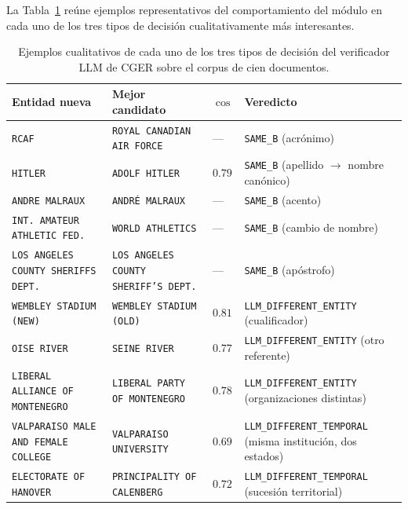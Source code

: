 La Tabla~\ref{tab:eval-ragtest-cger-samples} reúne ejemplos representativos del comportamiento del módulo en cada uno de los tres tipos de decisión cualitativamente más interesantes.

\begin{table}[h]
\centering
\small
\begin{tabular}{p{4.2cm}p{4.2cm}p{1.0cm}p{4.0cm}}
\hline
\textbf{Entidad nueva} & \textbf{Mejor candidato} & \textbf{$\cos$} & \textbf{Veredicto} \\ \hline
\texttt{RCAF} & \texttt{ROYAL CANADIAN AIR FORCE} & --- & \texttt{SAME\_B} (acrónimo) \\
\texttt{HITLER} & \texttt{ADOLF HITLER} & $0.79$ & \texttt{SAME\_B} (apellido $\to$ nombre canónico) \\
\texttt{ANDRE MALRAUX} & \texttt{ANDRÉ MALRAUX} & --- & \texttt{SAME\_B} (acento) \\
\texttt{INT.\ AMATEUR ATHLETIC FED.} & \texttt{WORLD ATHLETICS} & --- & \texttt{SAME\_B} (cambio de nombre) \\
\texttt{LOS ANGELES COUNTY SHERIFFS DEPT.} & \texttt{LOS ANGELES COUNTY SHERIFF'S DEPT.} & --- & \texttt{SAME\_B} (apóstrofo) \\
\hline
\texttt{WEMBLEY STADIUM (NEW)} & \texttt{WEMBLEY STADIUM (OLD)} & $0.81$ & \texttt{LLM\_DIFFERENT\_ENTITY} (cualificador) \\
\texttt{OISE RIVER} & \texttt{SEINE RIVER} & $0.77$ & \texttt{LLM\_DIFFERENT\_ENTITY} (otro referente) \\
\texttt{LIBERAL ALLIANCE OF MONTENEGRO} & \texttt{LIBERAL PARTY OF MONTENEGRO} & $0.78$ & \texttt{LLM\_DIFFERENT\_ENTITY} (organizaciones distintas) \\
\hline
\texttt{VALPARAISO MALE AND FEMALE COLLEGE} & \texttt{VALPARAISO UNIVERSITY} & $0.69$ & \texttt{LLM\_DIFFERENT\_TEMPORAL} (misma institución, dos estados) \\
\texttt{ELECTORATE OF HANOVER} & \texttt{PRINCIPALITY OF CALENBERG} & $0.72$ & \texttt{LLM\_DIFFERENT\_TEMPORAL} (sucesión territorial) \\ \hline
\end{tabular}
\caption{Ejemplos cualitativos de cada uno de los tres tipos de decisión del verificador LLM de CGER sobre el corpus de cien documentos.}
\label{tab:eval-ragtest-cger-samples}
\end{table}

